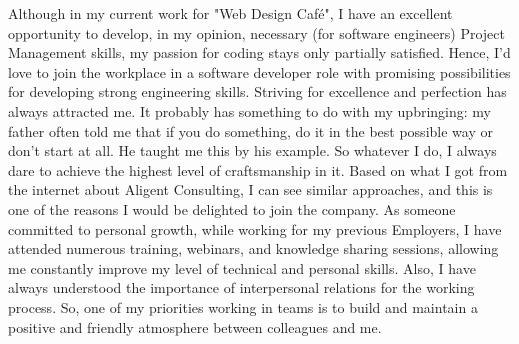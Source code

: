 \documentclass[10pt, a4paper]{awesome-cv}
\begin{document}
\begin{cvletter}
Although in my current work for "Web Design Café", I have an excellent opportunity to develop, in my opinion, necessary (for software engineers) Project Management skills, my passion for coding stays only partially satisfied. Hence, I'd love to join the workplace in a software developer role with promising possibilities for developing strong engineering skills.
Striving for excellence and perfection has always attracted me. It probably has something to do with my upbringing: my father often told me that if you do something, do it in the best possible way or don’t start at all. He taught me this by his example. So whatever I do, I always dare to achieve the highest level of craftsmanship in it. Based on what I got from the internet about Aligent Consulting, I can see similar approaches, and this is one of the reasons I would be delighted to join the company.
As someone committed to personal growth, while working for my previous Employers, I have attended numerous training, webinars, and knowledge sharing sessions, allowing me constantly improve my level of technical and personal skills. Also, I have always understood the importance of interpersonal relations for the working process. So, one of my priorities working in teams is to build and maintain a positive and friendly atmosphere between colleagues and me.

\end{cvletter}


\makeletterclosing
\end{document}

